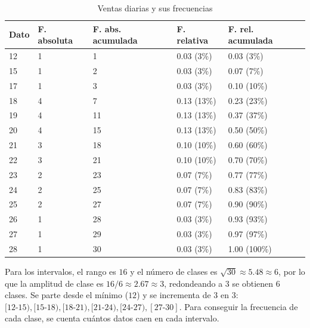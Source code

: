 \documentclass[12pt]{article}
\begin{document}
\begin{table}[h!]
    \begin{center}
        \begin{tabular}{|l|l|l|l|l|}
            \hline
            Dato & F. absoluta & F. abs. acumulada & F. relativa & F. rel. acumulada \\
            \hline
            12 & 1 &  1 & 0.03 (3\%) & 0.03 (3\%) \\
            15 & 1 &  2 & 0.03 (3\%) & 0.07 (7\%) \\
            17 & 1 &  3 & 0.03 (3\%) & 0.10 (10\%) \\
            18 & 4 &  7 & 0.13 (13\%) & 0.23 (23\%) \\
            19 & 4 & 11 & 0.13 (13\%) & 0.37 (37\%) \\
            20 & 4 & 15 & 0.13 (13\%) & 0.50 (50\%) \\
            21 & 3 & 18 & 0.10 (10\%) & 0.60 (60\%) \\
            22 & 3 & 21 & 0.10 (10\%) & 0.70 (70\%) \\
            23 & 2 & 23 & 0.07 (7\%) & 0.77 (77\%) \\
            24 & 2 & 25 & 0.07 (7\%) & 0.83 (83\%) \\
            25 & 2 & 27 & 0.07 (7\%) & 0.90 (90\%) \\
            26 & 1 & 28 & 0.03 (3\%) & 0.93 (93\%) \\
            27 & 1 & 29 & 0.03 (3\%) & 0.97 (97\%) \\
            28 & 1 & 30 & 0.03 (3\%) & 1.00 (100\%) \\
            \hline
        \end{tabular}
        \caption{Ventas diarias y sus frecuencias}
        \label{tab:tabla_ventas}
    \end{center}
\end{table}

Para los intervalos, el rango es $16$ y el número de clases es $\sqrt{30} \approx 5.48 \approx 6$, por lo que la amplitud de clase es $16/6 \approx 2.67 \approx 3$, redondeando a $3$ se obtienen $6$ clases. Se parte desde el mínimo ($12$) y se incrementa de $3$ en $3$: $[12\text{-}15), [15\text{-}18), [18\text{-}21), [21\text{-}24), [24\text{-}27), [27\text{-}30]$. Para conseguir la frecuencia de cada clase, se cuenta cuántos datos caen en cada intervalo.
\end{document}
